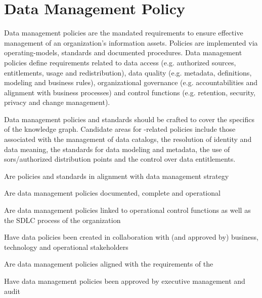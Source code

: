 \section{Data Management Policy}\label{sec:ekg-mm-b-4-2} %

Data management policies are the mandated requirements to ensure effective management of an organization’s
information assets.
Policies are implemented via \glspl{operating-model}, standards and documented procedures.
Data management policies define requirements related to data access (e.g. authorized sources, entitlements,
usage and redistribution), data quality (e.g. metadata, definitions, modeling and business rules),
organizational governance (e.g. accountabilities and alignment with business processes) and
control functions (e.g. retention, security, privacy and change management).

\ekgmmContextSection

Data management policies and standards should be crafted to cover the specifics of the knowledge graph.
Candidate areas for -related policies include those associated with the management of data catalogs,
the resolution of identity and data meaning, the standards for data modeling and metadata,
the use of \glspl{sor}/authorized distribution points and the control over data entitlements.

\kgmmcorequestionssection

\begin{core-questions}

  \item [\thesection.1] Are policies and standards in alignment with data management strategy
  \item [\thesection.2] Are data management policies documented, complete and operational
  \item [\thesection.3] Are data management policies linked to operational control functions as well as the
                        SDLC process of the organization
  \item [\thesection.4] Have data policies been created in collaboration with (and approved by) business, technology
                        and operational stakeholders
  \item [\thesection.5] Are data management policies aligned with the requirements of the 
  \item [\thesection.6] Have data management policies been approved by executive management and audit

\end{core-questions}

